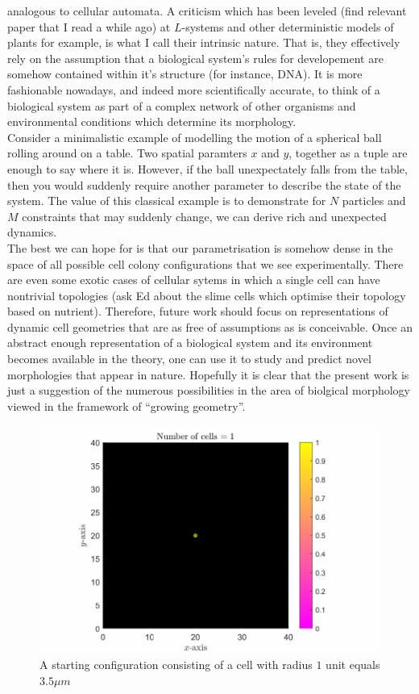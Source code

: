 analogous to cellular automata. A criticism which has been leveled 
(find relevant paper that I read a while ago) at $L$-systems and other deterministic models
of plants for example, is what I call their intrinsic nature. That is, they effectively
rely on the assumption that a biological system's rules for developement are somehow contained
within it's structure (for instance, DNA). It is more fashionable nowadays, and indeed more 
scientifically accurate, to think of a biological system as part of a complex network 
of other organisms and environmental conditions which determine its morphology.
\\
Consider a minimalistic example of modelling the motion of a spherical ball rolling around on a table.
Two spatial paramters $x$ and $y$, together as a tuple are enough to say where it is. However, 
if the ball unexpectately falls from the table, then you would suddenly require
another parameter to describe the state of the system. The value of this classical example
is to demonstrate for $N$ particles and $M$ constraints that may suddenly change, 
we can derive rich and unexpected dynamics.
\\
The best we can hope for is that our parametrisation is somehow dense in the space
of all possible cell colony configurations that we see experimentally. There are even
some exotic cases of cellular sytems in which a single cell can have nontrivial topologies (ask Ed 
about the slime cells which optimise their topology based on nutrient). Therefore, future work 
should focus on representations of dynamic cell geometries that are as free of assumptions as
is conceivable. Once an abstract enough representation of a biological system and its environment
becomes available in the theory, one can use it to study and predict novel morphologies that appear 
in nature. Hopefully it is clear that the present work is just a suggestion of the numerous possibilities
in the area of biolgical morphology viewed in the framework of ``growing geometry''.


\begin{figure}[h]
\centering
\includegraphics[width=1\textwidth]{chapter1/figures/ColonySimulationDemo_N_1.pdf}
\caption{A starting configuration consisting of a cell with radius $1$ unit equals $3.5 \mu m$}
\label{fig:ColonySimulationStartingCell}
\end{figure}
\filbreak



